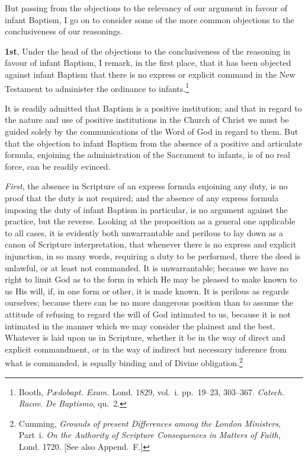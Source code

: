 \documentclass[
]{book}
\begin{document}
But passing from the objections to the relevancy of our argument in favour of infant Baptism, I go on to consider some of the more common objections to the conclusiveness of our reasonings.

\textbf{1st}, Under the head of the objections to the conclusiveness of the reasoning in favour of infant Baptism, I remark, in the first place, that it has been objected against infant Baptism that there is no express or explicit command in the New Testament to administer the ordinance to infants.\footnote{Booth, \emph{Pædobapt. Exam.} Lond. 1829, vol.~i. pp.~19--23, 303--367. \emph{Catech. Racov. De Baptismo}, qu.~2.}

It is readily admitted that Baptism is a positive institution; and that in regard to the nature and use of positive institutions in the Church of Christ we must be guided solely by the communications of the Word of God in regard to them. But that the objection to infant Baptism from the absence of a positive and articulate formula, enjoining the administration of the Sacrament to infants, is of no real force, can be readily evinced.

\emph{First}, the absence in Scripture of an express formula enjoining any duty, is no proof that the duty is not required; and the absence of any express formula imposing the duty of infant Baptism in particular, is no argument against the practice, but the reverse. Looking at the proposition as a general one applicable to all cases, it is evidently both unwarrantable and perilous to lay down as a canon of Scripture interpretation, that whenever there is no express and explicit injunction, in so many words, requiring a duty to be performed, there the deed is unlawful, or at least not commanded. It is unwarrantable; because we have no right to limit God as to the form in which He may be pleased to make known to us His will, if, in one form or other, it is made known. It is perilous as regards ourselves; because there can be no more dangerous position than to assume the attitude of refusing to regard the will of God intimated to us, because it is not intimated in the manner which we may consider the plainest and the best. Whatever is laid upon us in Scripture, whether it be in the way of direct and explicit commandment, or in the way of indirect but necessary inference from what is commanded, is equally binding and of Divine obligation.\footnote{Cumming, \emph{Grounds of present Differences among the London Ministers}, Part~i. \emph{On the Authority of Scripture Consequences in Matters of Faith}, Lond. 1720. {[}See also Append.~F.{]}}
\end{document}
